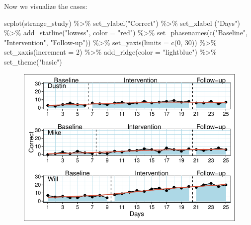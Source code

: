 \documentclass[
  letterpaper,
  DIV=11,
  numbers=noendperiod]{scrreprt}
\newenvironment{Shaded}{\begin{snugshade}}{\end{snugshade}}
\newcommand{\AttributeTok}[1]{\textcolor[rgb]{0.40,0.45,0.13}{#1}}
\newcommand{\DecValTok}[1]{\textcolor[rgb]{0.68,0.00,0.00}{#1}}
\newcommand{\FunctionTok}[1]{\textcolor[rgb]{0.28,0.35,0.67}{#1}}
\newcommand{\NormalTok}[1]{\textcolor[rgb]{0.00,0.23,0.31}{#1}}
\newcommand{\SpecialCharTok}[1]{\textcolor[rgb]{0.37,0.37,0.37}{#1}}
\newcommand{\StringTok}[1]{\textcolor[rgb]{0.13,0.47,0.30}{#1}}
\begin{document}
Now we visualize the cases:

\begin{Shaded}
\begin{Highlighting}[]
\FunctionTok{scplot}\NormalTok{(strange\_study) }\SpecialCharTok{\%\textgreater{}\%}
  \FunctionTok{set\_ylabel}\NormalTok{(}\StringTok{"Correct"}\NormalTok{) }\SpecialCharTok{\%\textgreater{}\%}
  \FunctionTok{set\_xlabel}\NormalTok{ (}\StringTok{"Days"}\NormalTok{) }\SpecialCharTok{\%\textgreater{}\%}
  \FunctionTok{add\_statline}\NormalTok{(}\StringTok{"lowess"}\NormalTok{, }\AttributeTok{color =} \StringTok{"red"}\NormalTok{) }\SpecialCharTok{\%\textgreater{}\%}
  \FunctionTok{set\_phasenames}\NormalTok{(}\FunctionTok{c}\NormalTok{(}\StringTok{"Baseline"}\NormalTok{, }\StringTok{"Intervention"}\NormalTok{, }\StringTok{"Follow{-}up"}\NormalTok{)) }\SpecialCharTok{\%\textgreater{}\%}
  \FunctionTok{set\_yaxis}\NormalTok{(}\AttributeTok{limits =} \FunctionTok{c}\NormalTok{(}\DecValTok{0}\NormalTok{, }\DecValTok{30}\NormalTok{)) }\SpecialCharTok{\%\textgreater{}\%}
  \FunctionTok{set\_xaxis}\NormalTok{(}\AttributeTok{increment =} \DecValTok{2}\NormalTok{) }\SpecialCharTok{\%\textgreater{}\%}
  \FunctionTok{add\_ridge}\NormalTok{(}\AttributeTok{color =} \StringTok{"lightblue"}\NormalTok{) }\SpecialCharTok{\%\textgreater{}\%}
  \FunctionTok{set\_theme}\NormalTok{(}\StringTok{"basic"}\NormalTok{)}
\end{Highlighting}
\end{Shaded}

\begin{figure}[H]

{\centering \includegraphics{./ch_introduction_files/figure-pdf/plot-strange-study-1.pdf}

}

\end{figure}
\end{document}
